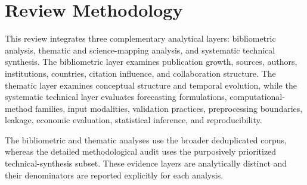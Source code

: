 \documentclass[pdflatex,sn-mathphys-num]{sn-jnl}%
\theoremstyle{thmstyleone}%
\theoremstyle{thmstyletwo}%
\theoremstyle{thmstylethree}%
\begin{document}
\section{Review Methodology}
\label{sec2}


This review integrates three complementary analytical layers:
bibliometric analysis, thematic and science-mapping analysis, and
systematic technical synthesis. The bibliometric layer examines publication
growth, sources, authors, institutions, countries, citation influence, and
collaboration structure. The thematic layer examines conceptual structure
and temporal evolution, while the systematic technical layer evaluates
forecasting formulations, computational-method families, input modalities,
validation practices, preprocessing boundaries, leakage, economic evaluation,
statistical inference, and reproducibility.

The bibliometric and thematic analyses use the broader deduplicated corpus,
whereas the detailed methodological audit uses the purposively prioritized
technical-synthesis subset. These evidence layers are analytically distinct
and their denominators are reported explicitly for each analysis.


\end{document}
